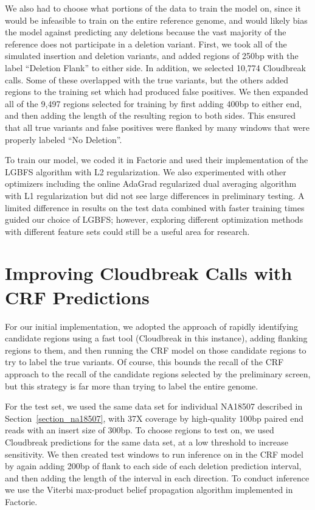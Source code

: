 We also had to choose what portions of the data to train the model on, since it would be infeasible to train on the entire reference genome, and would likely bias the model against predicting any deletions because the vast majority of the reference does not participate in a deletion variant. First, we took all of the simulated insertion and deletion variants, and added regions of 250bp with the label ``Deletion Flank'' to either side. In addition, we selected 10,774 Cloudbreak calls. Some of these overlapped with the true variants, but the others added regions to the training set which had produced false positives. We then expanded all of the 9,497 regions selected for training by first adding 400bp to either end, and then adding the length of the resulting region to both sides. This ensured that all true variants and false positives were flanked by many windows that were properly labeled ``No Deletion''.

To train our model, we coded it in Factorie and used their implementation of the LGBFS algorithm with L2 regularization. We also experimented with other optimizers including the online AdaGrad regularized dual averaging algorithm \cite{Duchi:2011:ASM:1953048.2021068} with L1 regularization but did not see large differences in preliminary testing. A limited difference in results on the test data combined with faster training times guided our choice of LGBFS; however, exploring different optimization methods with different feature sets could still be a useful area for research.

\section{Improving Cloudbreak Calls with CRF Predictions}

For our initial implementation, we adopted the approach of rapidly identifying candidate regions using a fast tool (Cloudbreak in this instance), adding flanking regions to them, and then running the CRF model on those candidate regions to try to label the true variants. Of course, this bounds the recall of the CRF approach to the recall of the candidate regions selected by the preliminary screen, but this strategy is far more than trying to label the entire genome.

For the test set, we used the same data set for individual NA18507 described in Section~\ref{section_na18507}, with 37X coverage by high-quality 100bp paired end reads with an insert size of 300bp. To choose regions to test on, we used Cloudbreak predictions for the same data set, at a low threshold to increase sensitivity.  We then created test windows to run inference on in the CRF model by again adding 200bp of flank to each side of each deletion prediction interval, and then adding the length of the interval in each direction. To conduct inference we use the Viterbi max-product belief propagation algorithm implemented in Factorie.

